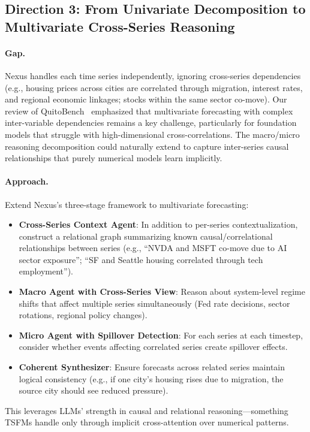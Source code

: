 \documentclass[11pt,a4paper]{article}
\begin{document}
\subsection{Direction 3: From Univariate Decomposition to Multivariate Cross-Series Reasoning}

\paragraph{Gap.} Nexus handles each time series independently, ignoring cross-series dependencies (e.g., housing prices across cities are correlated through migration, interest rates, and regional economic linkages; stocks within the same sector co-move). Our review of QuitoBench~\cite{quitobench} emphasized that multivariate forecasting with complex inter-variable dependencies remains a key challenge, particularly for foundation models that struggle with high-dimensional cross-correlations. The macro/micro reasoning decomposition could naturally extend to capture inter-series causal relationships that purely numerical models learn implicitly.

\paragraph{Approach.} Extend Nexus's three-stage framework to multivariate forecasting:
\begin{itemize}[nosep]
\item \textbf{Cross-Series Context Agent}: In addition to per-series contextualization, construct a relational graph summarizing known causal/correlational relationships between series (e.g., ``NVDA and MSFT co-move due to AI sector exposure''; ``SF and Seattle housing correlated through tech employment'').
\item \textbf{Macro Agent with Cross-Series View}: Reason about system-level regime shifts that affect multiple series simultaneously (Fed rate decisions, sector rotations, regional policy changes).
\item \textbf{Micro Agent with Spillover Detection}: For each series at each timestep, consider whether events affecting correlated series create spillover effects.
\item \textbf{Coherent Synthesizer}: Ensure forecasts across related series maintain logical consistency (e.g., if one city's housing rises due to migration, the source city should see reduced pressure).
\end{itemize}
This leverages LLMs' strength in causal and relational reasoning---something TSFMs handle only through implicit cross-attention over numerical patterns.
\end{document}
